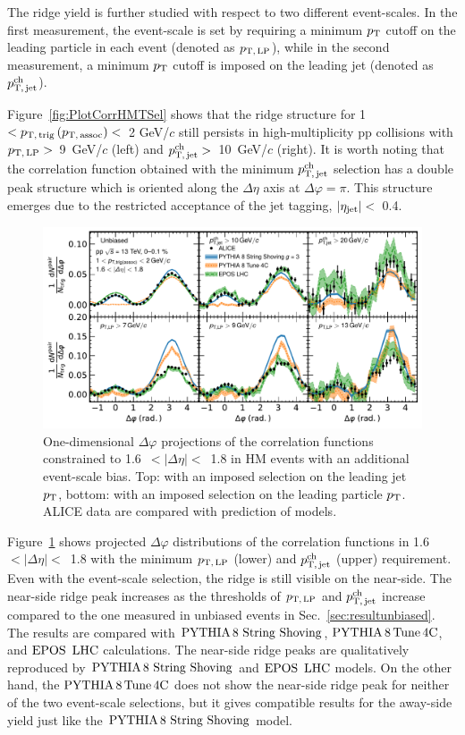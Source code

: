 The ridge yield is further studied with respect to two different event-scales. In the first measurement, the event-scale is set by requiring a minimum $p_\mathrm{T}$ cutoff on the leading particle in each event (denoted as $p_\mathrm{T,\,LP}$), while in the second measurement, a minimum $p_\mathrm{T}$ cutoff is imposed on the leading jet (denoted as $p_\mathrm{T,\,jet}^\mathrm{ch}$). 

Figure~\ref{fig:PlotCorrHMTSel} shows that the ridge structure for 1~$< p_\mathrm{T,\,trig}\,(p_\mathrm{T,\,assoc}) <$~2 GeV/$c$ still persists in high-multiplicity pp collisions with $p_\mathrm{T,\,LP}>$~9~GeV/$c$ (left) and $p_\mathrm{T,\,jet}^\mathrm{ch}>$~10~GeV/$c$ (right).  %
It is worth noting that the correlation function obtained with the minimum $p_\mathrm{T,\,jet}^\mathrm{ch}$ selection has a double peak structure which is oriented along the $\Delta\eta$ axis at $\Delta\varphi=\pi$. This structure emerges due to the restricted acceptance of the jet tagging, $|\eta_{\rm{jet}}|<$~0.4.

\begin{figure}[h!]
	\centering
	\includegraphics[width=0.99\linewidth]{./figures/Fig5_PlotDeltaPhiESE.pdf}
	\caption{ One-dimensional $\Delta\varphi$ projections of the correlation functions constrained to 1.6~$<|\Delta\eta|<$~1.8 in HM events with an additional event-scale bias. Top: with an imposed selection on the leading jet $p_\mathrm{T}$,  bottom: with an imposed selection on the leading particle $p_\mathrm{T}$. ALICE data are compared with prediction of models.}
	\label{fig:PlotDeltaPhiESE}
\end{figure}

Figure~\ref{fig:PlotDeltaPhiESE} shows projected $\Delta\varphi$ distributions of the correlation functions in 1.6~$<|\Delta\eta|<$~1.8 with the minimum $p_\mathrm{T,\,LP}$ (lower) and $p_\mathrm{T,\,jet}^\mathrm{ch}$ (upper) requirement. Even with the event-scale selection, the ridge is still visible on the near-side. The near-side ridge peak increases as the thresholds of $p_\mathrm{T,\,LP}$ and $p_\mathrm{T,\,jet}^\mathrm{ch}$ increase compared to the one measured in unbiased events in Sec.~\ref{sec:resultunbiased}. The results are compared with ${\mathrm{PYTHIA}\,8~\mathrm{String}~}\mathrm{Shoving}$, $\mathrm{PYTHIA}\,8\,\mathrm{Tune\,4C}$, and ${\mathrm{EPOS}\,~\mathrm{LHC}}$ calculations. The near-side ridge peaks are qualitatively reproduced by ${\mathrm{PYTHIA}\,8~\mathrm{String}~}\mathrm{Shoving}$ and ${\mathrm{EPOS}\,~\mathrm{LHC}}$ models. On the other hand, the $\mathrm{PYTHIA}\,8\,\mathrm{Tune\,4C}$ does not show the  near-side ridge peak for neither of the two event-scale selections, but it gives compatible results for the away-side yield just like the ${\mathrm{PYTHIA}\,8~\mathrm{String}~}\mathrm{Shoving}$ model.

